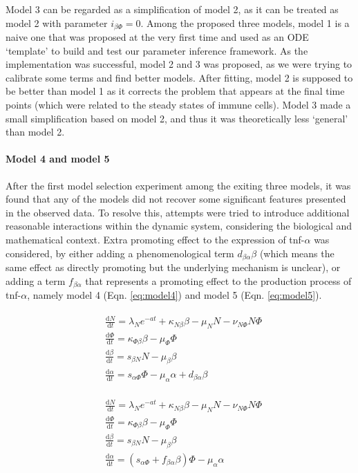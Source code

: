 Model 3 can be regarded as a simplification of model 2, as it can be treated as model 2 with parameter $i_{\beta\Phi}=0$. Among the proposed three models, model 1 is a naive one that was proposed at the very first time and used as an ODE `template' to build and test our parameter inference framework. As the implementation was successful, model 2 and 3 was proposed, as we were trying to calibrate some terms and find better models. After fitting, model 2 is supposed to be better than model 1 as it corrects the problem that appears at the final time points (which were related to the steady states of immune cells). Model 3 made a small simplification based on model 2, and thus it was theoretically less `general' than model 2.

\paragraph{Model 4 and model 5}

After the first model selection experiment among the exiting three models, it was found that any of the models did not recover some significant features presented in the observed data. To resolve this, attempts were tried to introduce additional reasonable interactions within the dynamic system, considering the biological and mathematical context. Extra promoting effect to the expression of tnf-$\alpha$ was considered, by either adding a phenomenological term $d_{\beta\alpha}\beta$ (which means the same effect as directly promoting but the underlying mechanism is unclear), or adding a term $f_{\beta\alpha}$ that represents a promoting effect to the production process of tnf-$\alpha$, namely model 4 (Eqn. \ref{eq:model4}) and model 5 (Eqn. \ref{eq:model5}).

\begin{align}
    \label{eq:model4}
    \begin{split}
        &\frac{\mathrm{d} N}{\mathrm{d} t}=\lambda_Ne^{-at}+\kappa_{N\beta}\beta-\mu_NN-\nu_{N\Phi}N\Phi\\
        &\frac{\mathrm{d} \Phi}{\mathrm{d} t}=\kappa_{\Phi\beta}\beta-\mu_\Phi\Phi\\
        &\frac{\mathrm{d} \beta}{\mathrm{d} t}=s_{\beta N}N-\mu_\beta\beta\\
        &\frac{\mathrm{d} \alpha}{\mathrm{d} t}=s_{\alpha\Phi}\Phi-\mu_\alpha\alpha+d_{\beta\alpha}\beta
    \end{split}
\end{align}

\begin{align}
    \label{eq:model5}
    \begin{split}
        &\frac{\mathrm{d} N}{\mathrm{d} t}=\lambda_Ne^{-at}+\kappa_{N\beta}\beta-\mu_NN-\nu_{N\Phi}N\Phi\\
        &\frac{\mathrm{d} \Phi}{\mathrm{d} t}=\kappa_{\Phi\beta}\beta-\mu_\Phi\Phi\\
        &\frac{\mathrm{d} \beta}{\mathrm{d} t}=s_{\beta N}N-\mu_\beta\beta\\
        &\frac{\mathrm{d} \alpha}{\mathrm{d} t}=(s_{\alpha\Phi}+f_{\beta\alpha}\beta)\Phi-\mu_\alpha\alpha
    \end{split}
\end{align}

